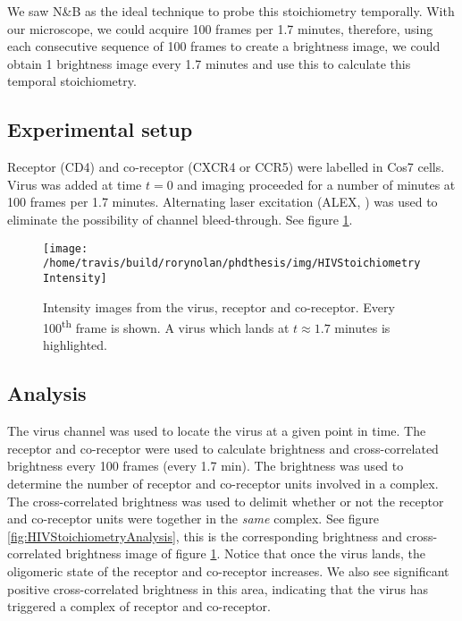 \documentclass[12pt,]{book}
\theoremstyle{definition}
\theoremstyle{definition}
\theoremstyle{definition}
\theoremstyle{remark}
\begin{document}
We saw N\&B as the ideal technique to probe this stoichiometry
temporally. With our microscope, we could acquire 100 frames per 1.7
minutes, therefore, using each consecutive sequence of 100 frames to
create a brightness image, we could obtain 1 brightness image every 1.7
minutes and use this to calculate this temporal stoichiometry.

\subsection{Experimental setup}\label{experimental-setup}

Receptor (CD4) and co-receptor (CXCR4 or CCR5) were labelled in Cos7
cells. Virus was added at time \(t=0\) and imaging proceeded for a
number of minutes at 100 frames per 1.7 minutes. Alternating laser
excitation (ALEX, \citet{ALEX}) was used to eliminate the possibility of
channel bleed-through. See figure \ref{fig:HIVStoichiometryIntensity}.





\begin{figure}

\texttt{[image: /home/travis/build/rorynolan/phdthesis/img/HIVStoichiometryIntensity]} \hfill{}

\caption{Intensity images from the virus,
receptor and co-receptor. Every 100\textsuperscript{th} frame is shown.
A virus which lands at \(t \approx 1.7\) minutes is highlighted.}\label{fig:HIVStoichiometryIntensity}
\end{figure}

\subsection{Analysis}\label{analysis}

The virus channel was used to locate the virus at a given point in time.
The receptor and co-receptor were used to calculate brightness and
cross-correlated brightness every 100 frames (every 1.7 min). The
brightness was used to determine the number of receptor and co-receptor
units involved in a complex. The cross-correlated brightness was used to
delimit whether or not the receptor and co-receptor units were together
in the \emph{same} complex. See figure
\ref{fig:HIVStoichiometryAnalysis}, this is the corresponding brightness
and cross-correlated brightness image of figure
\ref{fig:HIVStoichiometryIntensity}. Notice that once the virus lands,
the oligomeric state of the receptor and co-receptor increases. We also
see significant positive cross-correlated brightness in this area,
indicating that the virus has triggered a complex of receptor and
co-receptor.
\end{document}
